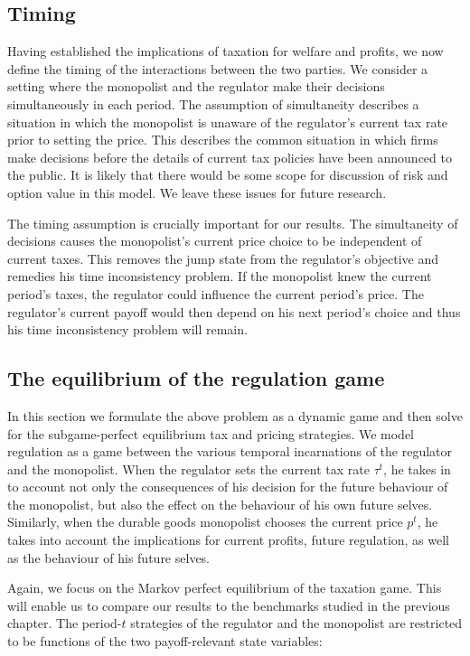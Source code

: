 \subsection{Timing}

Having established the implications of taxation for welfare and profits, we
now define the timing of the interactions between the two parties. We
consider a setting where the monopolist and the regulator make their
decisions simultaneously in each period. The assumption of simultaneity
describes a situation in which the monopolist is unaware of the regulator's
current tax rate prior to setting the price. This describes the common
situation in which firms make decisions before the details of current tax
policies have been announced to the public. It is likely that there would be
some scope for discussion of risk and option value in this model. We leave
these issues for future research.

The timing assumption is crucially important for our results. The
simultaneity of decisions causes the monopolist's current price choice to be
independent of current taxes. This removes the jump state from the
regulator's objective and remedies his time inconsistency problem. If the
monopolist knew the current period's taxes, the regulator could influence
the current period's price. The regulator's current payoff would then depend
on his next period's choice and thus his time inconsistency problem will
remain.

\subsection{The equilibrium of the regulation game}

\label{sec:regulation-game}

In this section we formulate the above problem as a dynamic game and then
solve for the subgame-perfect equilibrium tax and pricing strategies. We
model regulation as a game between the various temporal incarnations of the
regulator and the monopolist. When the regulator sets the current tax rate $%
\tau ^{t}$, he takes in to account not only the consequences of his decision
for the future behaviour of the monopolist, but also the effect on the
behaviour of his own future selves. Similarly, when the durable goods
monopolist chooses the current price $p^{t}$, he takes into account the
implications for current profits, future regulation, as well as the
behaviour of his future selves.

Again, we focus on the Markov perfect equilibrium of the taxation game. This
will enable us to compare our results to the benchmarks studied in the
previous chapter. The period-$t$ strategies of the regulator and the
monopolist are restricted to be functions of the two payoff-relevant state
variables:

